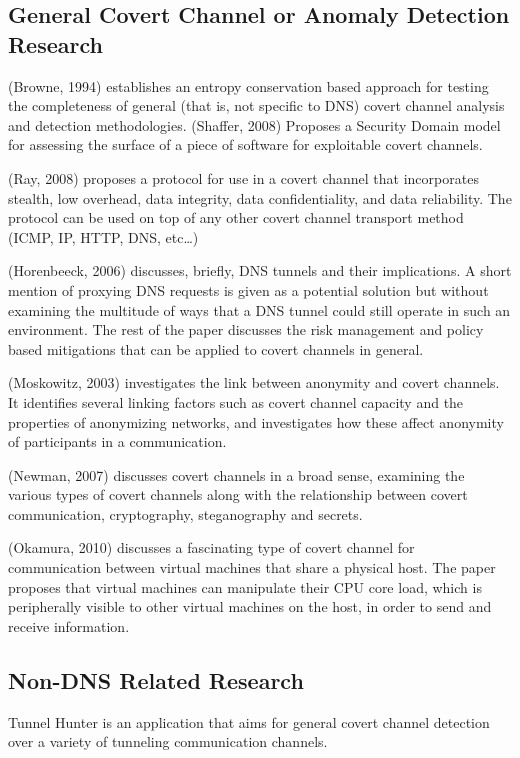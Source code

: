 \documentclass[12pt]{article}
\theoremstyle{remark}
\theoremstyle{definition}
\theoremstyle{definition}
\theoremstyle{definition}
\begin{document}
\subsection{General Covert Channel or Anomaly Detection Research}
(Browne, 1994)\cite{Browne1994} establishes an entropy conservation based approach for testing the completeness of general (that is, not specific to DNS) covert channel analysis and detection methodologies. (Shaffer, 2008)\cite{Shaffer2008} Proposes a Security Domain model for assessing the surface of a piece of software for exploitable covert channels.

(Ray, 2008)\cite{Ray2008} proposes a protocol for use in a covert channel that incorporates stealth, low overhead, data integrity, data confidentiality, and data reliability. The protocol can be used on top of any other covert channel transport method (ICMP, IP, HTTP, DNS, etc\ldots)

(Horenbeeck, 2006)\cite{Horenbeeck2006} discusses, briefly, DNS tunnels and their implications. A short mention of proxying DNS requests is given as a potential solution but without examining the multitude of ways that a DNS tunnel could still operate in such an environment. The rest of the paper discusses the risk management and policy based mitigations that can be applied to covert channels in general.

(Moskowitz, 2003)\cite{Moskowitz2003} investigates the link between anonymity and covert channels. It identifies several linking factors such as covert channel capacity and the properties of anonymizing networks, and investigates how these affect anonymity of participants in a communication.

(Newman, 2007)\cite{Newman2007} discusses covert channels in a broad sense, examining the various types of covert channels along with the relationship between covert communication, cryptography, steganography and secrets. 

(Okamura, 2010)\cite{Okamura2010} discusses a fascinating type of covert channel for communication between virtual machines that share a physical host. The paper proposes that virtual machines can manipulate their CPU core load, which is peripherally visible to other virtual machines on the host, in order to send and receive information.

\subsection{Non-DNS Related Research}
Tunnel Hunter\cite{Dusi2009} is an application that aims for general covert channel detection over a variety of tunneling communication channels.
\end{document}
